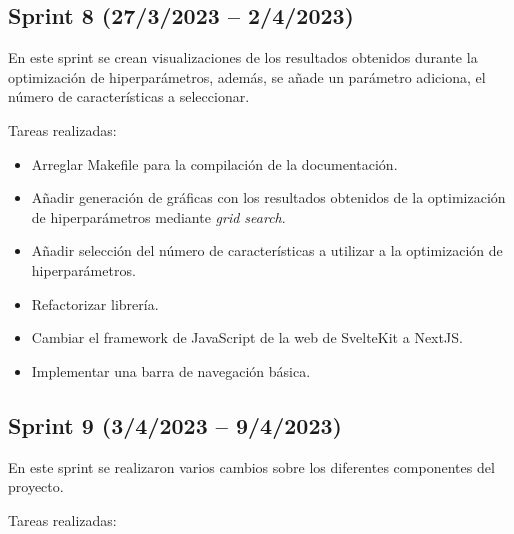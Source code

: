 \subsection{Sprint 8 (27/3/2023 -- 2/4/2023)}

En este sprint se crean visualizaciones de los resultados obtenidos durante la
optimización de hiperparámetros, además, se añade un parámetro adiciona, el
número de características a seleccionar.

Tareas realizadas:

\begin{itemize}
    \item Arreglar Makefile para la compilación de la documentación.
    \item Añadir generación de gráficas con los resultados obtenidos de la
    optimización de hiperparámetros mediante \textit{grid search}.
    \item Añadir selección del número de características a utilizar a la
          optimización de hiperparámetros.
    \item Refactorizar librería.
    \item Cambiar el framework de JavaScript de la web de SvelteKit a NextJS.
    \item Implementar una barra de navegación básica.
\end{itemize}

\subsection{Sprint 9 (3/4/2023 -- 9/4/2023)}

En este sprint se realizaron varios cambios sobre los diferentes componentes del
proyecto.

Tareas realizadas:

